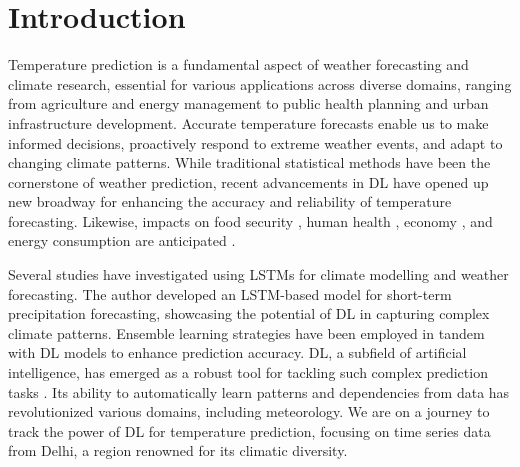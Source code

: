 
\chapter{Introduction} %

\label{c1} %


Temperature prediction is a fundamental aspect of weather forecasting and climate research, essential for various applications across diverse domains, ranging from agriculture and energy management to public health planning and urban infrastructure development. Accurate temperature forecasts enable us to make informed decisions, proactively respond to extreme weather events, and adapt to changing climate patterns. While traditional statistical methods have been the cornerstone of weather prediction, recent advancements in DL have opened up new broadway for enhancing the accuracy and reliability of temperature forecasting. Likewise, impacts on food security \cite{darapaneni2021food}, human health \cite{miotto2018deep}, economy \cite{dehghani2021enhancing}, and energy consumption are anticipated \cite{cifuentes2020air}.

Several studies have investigated using LSTMs for climate modelling and weather forecasting. \cite{qin2017dual} The author developed an LSTM-based model for short-term precipitation forecasting, showcasing the potential of DL in capturing complex climate patterns. Ensemble learning strategies have been employed in tandem with DL models to enhance prediction accuracy\cite{shi2015convolutional}. DL, a subfield of artificial intelligence, has emerged as a robust tool for tackling such complex prediction tasks \cite{karpatne2017theory}. Its ability to automatically learn patterns and dependencies from data has revolutionized various domains, including meteorology. We are on a journey to track the power of DL for temperature prediction, focusing on time series data from Delhi, a region renowned for its climatic diversity.

